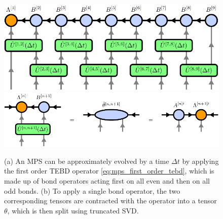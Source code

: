 \begin{figure}
	\centering
	\subcaptionbox{\label{fig:mps_tebd_first_order_overview}}
	{%
		\includegraphics[scale=1]{figures/tikz/Tensor_Networks/mps_TEBD/mps_TEBD_a.pdf}
	}
	\subcaptionbox{\label{fig:mps_tebd_first_order_applying_bond_op}}
	{%
		\includegraphics[scale=1]{figures/tikz/Tensor_Networks/mps_TEBD/mps_TEBD_b.pdf}
	}
	\caption{(a) An MPS can be approximately evolved by a time $\Delta t$ by applying the first order TEBD operator \eqref{eq:mps_first_order_tebd}, which is made up of bond operators acting first on all even and then on all odd bonds. (b) To apply a single bond operator, the two corresponding tensors are contracted with the operator into a tensor $\theta$, which is then split using truncated SVD.}
	\label{fig:mps_tebd_first_order}
\end{figure}